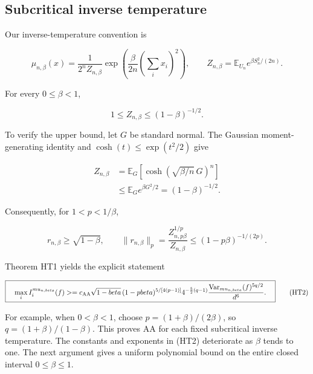\subsection{Subcritical inverse temperature}\label{ht:subcritical-inverse-temperature-0-ux3b2-1}

Our inverse-temperature convention is

\[
\mu_{n,\beta}(x)
=\frac{1}{2^n Z_{n,\beta}}
  \exp\!\left(\frac{\beta}{2n}\left(\sum_i x_i\right)^2\right),
\qquad
Z_{n,\beta}=\mathbb E_{U_n}e^{\beta S_n^2/(2n)}.
\tag{CW}
\]

For every \(0\le \beta<1\),

\[
1\le Z_{n,\beta}\le(1-\beta)^{-1/2}.
\tag{3.1}
\]

To verify the upper bound, let \(G\) be standard normal. The Gaussian moment-generating identity and \(\cosh(t)\le \exp(t^2/2)\) give

\[
\begin{aligned}
Z_{n,\beta}
 &=\mathbb E_G\left[\cosh\left(\sqrt{\beta/n}\,G\right)^n\right]\\
 &\le\mathbb E_G e^{\beta G^2/2}
 =(1-\beta)^{-1/2}.
\end{aligned}
\]

Consequently, for \(1<p<1/\beta\),

\[
r_{n,\beta}\ge\sqrt{1-\beta},\qquad
\|r_{n,\beta}\|_p
=\frac{Z_{n,p\beta}^{1/p}}{Z_{n,\beta}}
\le(1-p\beta)^{-1/(2p)}.
\]

Theorem HT1 yields the explicit statement

\[
\boxed{\quad
\max_i I_i^{\mu_{n,\beta}}(f)
\ge c_{\rm AA}\sqrt{1-\beta}\,
 (1-p\beta)^{5/[4(p-1)]}
 4^{-\frac52(q-1)}
 \frac{\operatorname{Var}_{\mu_{n,\beta}}(f)^{5q/2}}{d^6}.
\quad}
\tag{HT2}
\]

For example, when \(0<\beta<1\), choose \(p=(1+\beta)/(2\beta)\), so \(q=(1+\beta)/(1-\beta)\). This proves AA for each fixed subcritical inverse temperature. The constants and exponents in (HT2) deteriorate as \(\beta\) tends to one. The next argument gives a uniform polynomial bound on the entire closed interval \(0\le \beta\le 1\).
